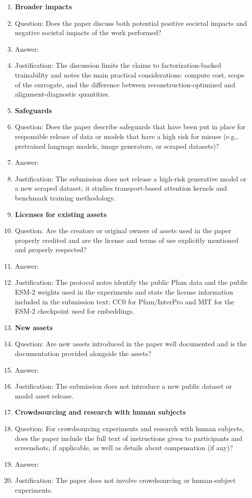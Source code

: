 \begin{enumerate}
\item {\bf Broader impacts}
    \item[] Question: Does the paper discuss both potential positive societal impacts and negative societal impacts of the work performed?
    \item[] Answer: \answerYes{}
    \item[] Justification: The discussion limits the claims to factorization-backed trainability and notes the main practical considerations: compute cost, scope of the surrogate, and the difference between reconstruction-optimized and alignment-diagnostic quantities.

\item {\bf Safeguards}
    \item[] Question: Does the paper describe safeguards that have been put in place for responsible release of data or models that have a high risk for misuse (e.g., pretrained language models, image generators, or scraped datasets)?
    \item[] Answer: \answerNA{}
    \item[] Justification: The submission does not release a high-risk generative model or a new scraped dataset; it studies transport-based attention kernels and benchmark training methodology.

\item {\bf Licenses for existing assets}
    \item[] Question: Are the creators or original owners of assets used in the paper properly credited and are the license and terms of use explicitly mentioned and properly respected?
    \item[] Answer: \answerYes{}
    \item[] Justification: The protocol notes identify the public Pfam data and the public ESM-2 weights used in the experiments and state the license information included in the submission text: CC0 for Pfam/InterPro and MIT for the ESM-2 checkpoint used for embeddings.

\item {\bf New assets}
    \item[] Question: Are new assets introduced in the paper well documented and is the documentation provided alongside the assets?
    \item[] Answer: \answerNA{}
    \item[] Justification: The submission does not introduce a new public dataset or model asset release.

\item {\bf Crowdsourcing and research with human subjects}
    \item[] Question: For crowdsourcing experiments and research with human subjects, does the paper include the full text of instructions given to participants and screenshots, if applicable, as well as details about compensation (if any)?
    \item[] Answer: \answerNA{}
    \item[] Justification: The paper does not involve crowdsourcing or human-subject experiments.


\end{enumerate}
